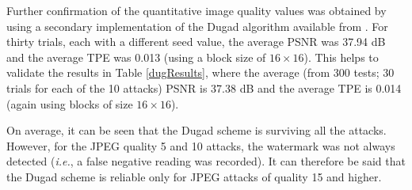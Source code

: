 \documentclass[10pt,twocolumn]{article}
\begin{document}






Further confirmation of the quantitative image quality values was obtained by 
using a secondary implementation of the Dugad algorithm available from 
\cite{meerwald}. For thirty trials, each with a different seed value,
the average PSNR was 37.94 dB and the average TPE was 0.013 
(using a block size of $16 \times 16$).
This helps to validate the results in Table
\ref{dugResults}, where the average (from 300 tests; 30 trials for each of the 10 attacks)
PSNR is 37.38 dB and the
average TPE is 0.014 (again using blocks of size $16 \times 16$).


On average, it can be seen that the Dugad scheme is surviving all the attacks.
However, for the JPEG quality 5 and 10 attacks, the watermark was not 
always detected (\emph{i.e.}, a false negative reading was recorded).
It can therefore be said that the Dugad scheme is reliable only for 
JPEG attacks of quality 15 and higher.
\end{document}
